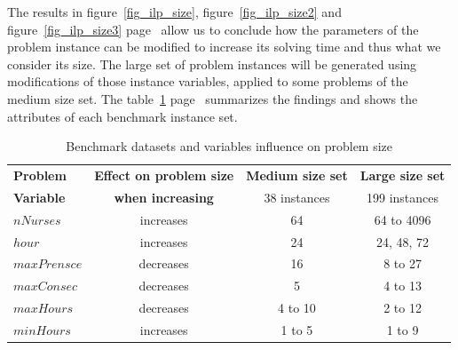 The results in figure~\ref{fig_ilp_size}, figure~\ref{fig_ilp_size2} and figure~\ref{fig_ilp_size3} page~\pageref{fig_ilp_size} allow us to conclude how the parameters of the problem instance can be modified to increase its solving time and thus what we consider its size. The large set of problem instances will be generated using modifications of those instance variables, applied to some problems of the medium size set. The table~\ref{tab:ilp_size} page~\pageref{tab:ilp_size} summarizes the findings and shows the attributes of each benchmark instance set.

\begin{table}[ht] 
\centering 
\begin{tabularx}{0.75\textwidth}{|l|c|c|c|}
\hline
\textbf{Problem} & \textbf{Effect on problem size}  & \textbf{Medium size set} & \textbf{Large size set} \\

\textbf{Variable}  		& \textbf{when increasing}  & 38 instances &  199 instances \\
\hline
\textbf{$nNurses$} & increases      &  64	&  64 to 4096 \\
\textbf{$hour$}   & increases		& 24	&  24, 48, 72 \\
\textbf{$maxPrensce$} & decreases	& 16	& 8 to 27 \\
\textbf{$maxConsec$} & decreases		& 5	&  4 to 13		\\
\textbf{$maxHours$} & decreases		& 4 to 10	& 2 to 12 \\
\textbf{$minHours$} & increases		& 1 to 5	& 1 to 9\\
\hline
\end{tabularx}
\caption{Benchmark datasets and variables influence on problem size}
\label{tab:ilp_size}
\end{table}


